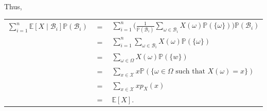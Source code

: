 \documentclass[6008notes.tex]{subfiles}
\begin{document}
Thus,

{\renewcommand{\arraystretch}{1.5}
\begin{tabular}{l l l}
$\sum _{i=1}^{n}\mathbb {E}[X\mid \mathcal{B}_{i}]\mathbb {P}(\mathcal{B}_{i})$ & $=$ & $\sum _{i=1}^{n}\bigg(\frac{1}{\mathbb {P}(\mathcal{B}_{i})}\sum _{\omega \in \mathcal{B}_{i}}X(\omega )\mathbb {P}(\{ \omega \} )\bigg)\mathbb {P}(\mathcal{B}_{i})$ \\
  & $=$ & $\sum _{i=1}^{n}\sum _{\omega \in \mathcal{B}_{i}}X(\omega )\mathbb {P}(\{ \omega \} )$ \\
  & $=$ & $\sum _{\omega \in \Omega }X(\omega )\mathbb {P}(\{ w\} )$ \\
  & $=$ & $\sum _{x\in \mathcal{X}}x\mathbb {P}(\{ \omega \in \Omega \text { such that }X(\omega )=x\} )$ \\
  & $=$ & $\sum _{x\in \mathcal{X}}xp_{X}(x)$ \\
  & $=$ & $\mathbb {E}[X].$ \\
\end{tabular}}
\end{document}
